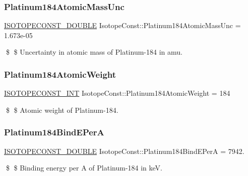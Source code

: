 \subsubsection{\texorpdfstring{Platinum184\+Atomic\+Mass\+Unc}{Platinum184AtomicMassUnc}}
{\footnotesize\ttfamily \mbox{\hyperlink{group___isotope_const-_macros_ga8f45a7272ce02c0b4c65c44636ed719a}{I\+S\+O\+T\+O\+P\+E\+C\+O\+N\+S\+T\+\_\+\+D\+O\+U\+B\+LE}} Isotope\+Const\+::\+Platinum184\+Atomic\+Mass\+Unc = 1.\+673e-\/05}

\$ \$ Uncertainty in atomic mass of Platinum-\/184 in amu. \mbox{\label{group___isotope_const-_platinum-_pt184_ga8a902720bac5a94bb5fed3274345b195}} 
\subsubsection{\texorpdfstring{Platinum184\+Atomic\+Weight}{Platinum184AtomicWeight}}
{\footnotesize\ttfamily \mbox{\hyperlink{group___isotope_const-_macros_ga5f18360b3e99483a35c32d789e62621c}{I\+S\+O\+T\+O\+P\+E\+C\+O\+N\+S\+T\+\_\+\+I\+NT}} Isotope\+Const\+::\+Platinum184\+Atomic\+Weight = 184}

\$ \$ Atomic weight of Platinum-\/184. \mbox{\label{group___isotope_const-_platinum-_pt184_gaf615c92936f4de64fc7411009919dca9}} 
\subsubsection{\texorpdfstring{Platinum184\+Bind\+E\+PerA}{Platinum184BindEPerA}}
{\footnotesize\ttfamily \mbox{\hyperlink{group___isotope_const-_macros_ga8f45a7272ce02c0b4c65c44636ed719a}{I\+S\+O\+T\+O\+P\+E\+C\+O\+N\+S\+T\+\_\+\+D\+O\+U\+B\+LE}} Isotope\+Const\+::\+Platinum184\+Bind\+E\+PerA = 7942.}

\$ \$ Binding energy per A of Platinum-\/184 in keV. \mbox{\label{group___isotope_const-_platinum-_pt184_gab2f91f468b69b31039a20670f71776f2}} 

